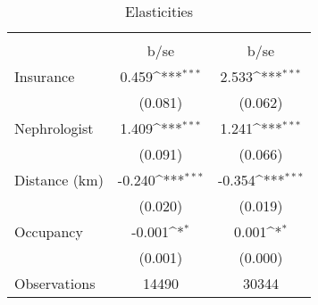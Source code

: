 \begin{table}[htbp]\centering
\def\sym#1{\ifmmode^{#1}\else\(^{#1}\)\fi}
\caption{Elasticities}
\begin{tabular}{l*{2}{c}}
\toprule
                    &\multicolumn{1}{c}{} &\multicolumn{1}{c}{} \\
                    &        b/se         &        b/se         \\
\midrule
Insurance           &       0.459\sym{***}&       2.533\sym{***}\\
                    &     (0.081)         &     (0.062)         \\
Nephrologist        &       1.409\sym{***}&       1.241\sym{***}\\
                    &     (0.091)         &     (0.066)         \\
Distance (km)       &      -0.240\sym{***}&      -0.354\sym{***}\\
                    &     (0.020)         &     (0.019)         \\
Occupancy           &      -0.001\sym{*}  &       0.001\sym{*}  \\
                    &     (0.001)         &     (0.000)         \\
\midrule
Observations        &       14490         &       30344         \\
\bottomrule
\end{tabular}
\end{table}
